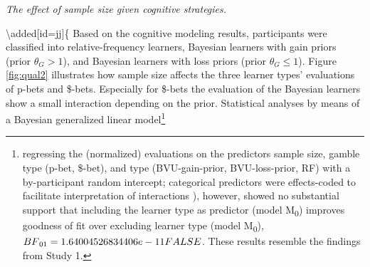 \documentclass[a4paper, man, floatsintext]{apa6}
\let\rmarkdownfootnote\footnote%
\def\footnote{\protect\rmarkdownfootnote}
\begin{document}
\emph{The effect of sample size given cognitive strategies.}

\textbackslash{}added{[}id=jj{]}\{ Based on the cognitive modeling
results, participants were classified into relative-frequency learners,
Bayesian learners with gain priors (prior \(\theta_G > 1\)), and
Bayesian learners with loss priors (prior \(\theta_G \leq 1\)). Figure
\ref{fig:qual2} illustrates how sample size affects the three learner
types' evaluations of p-bets and \$-bets. Especially for \$-bets the
evaluation of the Bayesian learners show a small interaction depending
on the prior. Statistical analyses by means of a Bayesian generalized
linear
model\footnote{regressing the (normalized) evaluations on the predictors sample size, gamble type (p-bet, \$-bet), and type (BVU-gain-prior, BVU-loss-prior, RF) with a by-participant random intercept; categorical predictors were effects-coded to facilitate interpretation of interactions \citep[for details, see][]{SingmannForthcoming}), however, showed no substantial support that including the learner type as predictor (model M\textsubscript{0}) improves goodness of fit over excluding learner type (model M\textsubscript{0}), $BF\textsubscript{01}=1.64004526834406e-11FALSE$. These results resemble the findings from Study 1.
}
\end{document}
